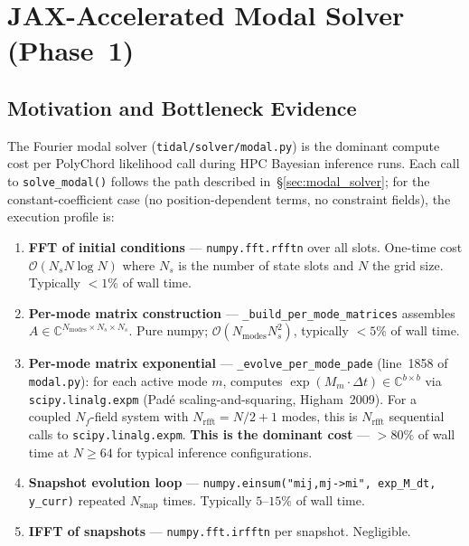 
\section{JAX-Accelerated Modal Solver (Phase~1)}
\label{sec:modal_jax}

\subsection{Motivation and Bottleneck Evidence}
\label{sec:modal_jax_motivation}

The Fourier modal solver (\texttt{tidal/solver/modal.py}) is the dominant
compute cost per PolyChord likelihood call during HPC Bayesian inference
runs.  Each call to \texttt{solve\_modal()} follows the path described
in~\S\ref{sec:modal_solver}; for the constant-coefficient case (no
position-dependent terms, no constraint fields), the execution profile
is:

\begin{enumerate}
  \item \textbf{FFT of initial conditions} — \texttt{numpy.fft.rfftn} over
    all slots.  One-time cost $\mathcal{O}(N_s N \log N)$ where $N_s$ is
    the number of state slots and $N$ the grid size.  Typically $<1\%$ of
    wall time.

  \item \textbf{Per-mode matrix construction} —
    \texttt{\_build\_per\_mode\_matrices} assembles
    $A \in \mathbb{C}^{N_{\mathrm{modes}} \times N_s \times N_s}$.
    Pure numpy; $\mathcal{O}(N_{\mathrm{modes}} N_s^2)$, typically $<5\%$
    of wall time.

  \item \textbf{Per-mode matrix exponential} —
    \texttt{\_evolve\_per\_mode\_pade} (line~1858 of \texttt{modal.py}):
    for each active mode $m$, computes
    $\exp(M_m \cdot \Delta t) \in \mathbb{C}^{b \times b}$
    via \texttt{scipy.linalg.expm} (Pad\'e scaling-and-squaring,
    Higham~2009).  For a coupled $N_f$-field system with $N_{\mathrm{rfft}}
    = N/2+1$ modes, this is $N_{\mathrm{rfft}}$ sequential calls to
    \texttt{scipy.linalg.expm}. \textbf{This is the dominant cost} — $>80\%$
    of wall time at $N \geq 64$ for typical inference configurations.

  \item \textbf{Snapshot evolution loop} — \texttt{numpy.einsum("mij,mj->mi",
    exp\_M\_dt, y\_curr)} repeated $N_{\mathrm{snap}}$ times.  Typically
    $5$–$15\%$ of wall time.

  \item \textbf{IFFT of snapshots} — \texttt{numpy.fft.irfftn} per snapshot.
    Negligible.
\end{enumerate}

